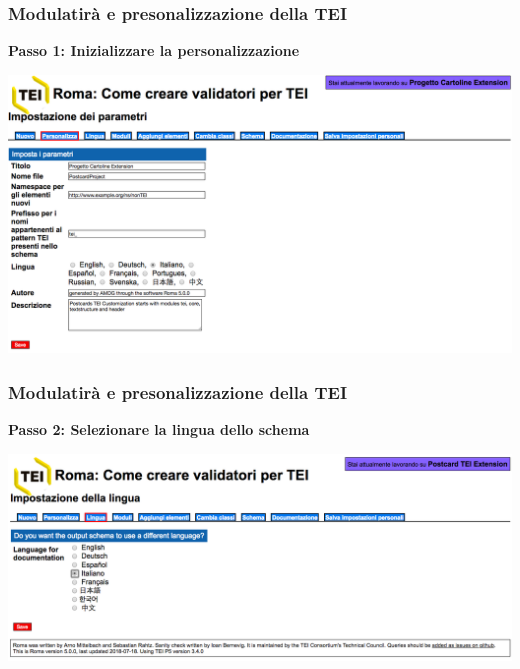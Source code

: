     \begin{frame}
        \frametitle{Modulatirà e presonalizzazione della TEI}
        \addtocounter{nframe}{1}
        
        \textbf{Passo 1: Inizializzare la personalizzazione}

         \begin{center}
            \includegraphics[width=.95\textwidth]{imgs/Roma2.png}
         \end{center}
       
        
    \end{frame}



\begin{frame}
    \frametitle{Modulatirà e presonalizzazione della TEI}
    \addtocounter{nframe}{1}
    
    \textbf{Passo 2: Selezionare la lingua dello schema}

     \begin{center}
        \includegraphics[width=.95\textwidth]{imgs/Roma3.png}
     \end{center}
   
    
\end{frame}

